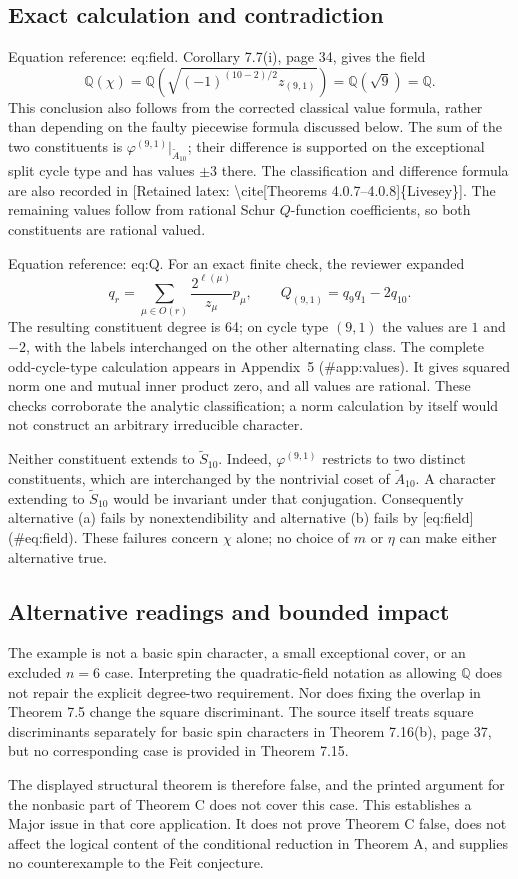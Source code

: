 \documentclass[10pt]{article}
\begin{document}
\subsection*{Exact calculation and contradiction}
Equation reference: eq:field. Corollary 7.7(i), page 34, gives the field \[
 \mathbb{Q}(\chi)=\mathbb{Q}\!\left(\sqrt{(-1)^{(10-2)/2}z_{(9,1)}}\right)
        =\mathbb{Q}(\sqrt9)=\mathbb{Q}.\] This conclusion also follows from the corrected classical value formula, rather than depending on the faulty piecewise formula discussed below. The sum of the two constituents is \(\varphi^{(9,1)}|_{\widetilde A_{10}}\); their difference is supported on the exceptional split cycle type and has values \(\pm3\) there. The classification and difference formula are also recorded in [Retained latex: \textbackslash{}cite[Theorems 4.0.7--4.0.8]\{Livesey\}]. The remaining values follow from rational Schur \(Q\)-function coefficients, so both constituents are rational valued.\par
Equation reference: eq:Q. For an exact finite check, the reviewer expanded \[
 q_r=\sum_{\mu\in O(r)}\frac{2^{\ell(\mu)}}{z_\mu}p_\mu,
 \qquad Q_{(9,1)}=q_9q_1-2q_{10}.\] The resulting constituent degree is 64; on cycle type \((9,1)\) the values are \(1\) and \(-2\), with the labels interchanged on the other alternating class. The complete odd-cycle-type calculation appears in Appendix 5 (\#app:values). It gives squared norm one and mutual inner product zero, and all values are rational. These checks corroborate the analytic classification; a norm calculation by itself would not construct an arbitrary irreducible character.\par
Neither constituent extends to \(\widetilde S_{10}\). Indeed, \(\varphi^{(9,1)}\) restricts to two distinct constituents, which are interchanged by the nontrivial coset of \(\widetilde A_{10}\). A character extending to \(\widetilde S_{10}\) would be invariant under that conjugation. Consequently alternative (a) fails by nonextendibility and alternative (b) fails by [eq:field] (\#eq:field). These failures concern \(\chi\) alone; no choice of \(m\) or \(\eta\) can make either alternative true.\par
\subsection*{Alternative readings and bounded impact}
The example is not a basic spin character, a small exceptional cover, or an excluded \(n=6\) case. Interpreting the quadratic-field notation as allowing \(\mathbb{Q}\) does not repair the explicit degree-two requirement. Nor does fixing the overlap in Theorem 7.5 change the square discriminant. The source itself treats square discriminants separately for basic spin characters in Theorem 7.16(b), page 37, but no corresponding case is provided in Theorem 7.15.\par
The displayed structural theorem is therefore false, and the printed argument for the nonbasic part of Theorem C does not cover this case. This establishes a Major issue in that core application. It does not prove Theorem C false, does not affect the logical content of the conditional reduction in Theorem A, and supplies no counterexample to the Feit conjecture.\par
\end{document}
